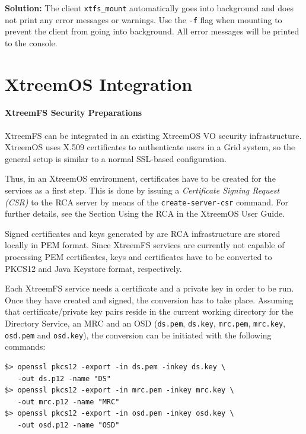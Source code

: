 \documentclass[a4paper,10pt]{book}
\begin{document}
\textbf{Solution: } The client \texttt{xtfs\_mount} automatically goes into background and does not print any error messages or warnings. Use the \texttt{-f} flag when mounting to prevent the client from going into background. All error messages will be printed to the console.

\appendix

\chapter{XtreemOS Integration}

\subsubsection{XtreemFS Security Preparations}
\label{installconf-xfs-security}

XtreemFS can be integrated in an existing XtreemOS VO security infrastructure. XtreemOS uses X.509 certificates to authenticate users in a Grid system, so the general setup is similar to a normal SSL-based configuration.

Thus, in an XtreemOS environment, certificates have to be created for the services as a first step. This is done by issuing a \textit{Certificate Signing Request (CSR)} to the RCA server by means of the \texttt{create-server-csr} command. For further details, see the Section Using the RCA in the XtreemOS User Guide.

Signed certificates and keys generated by are RCA infrastructure are stored locally in PEM format. Since XtreemFS services are currently not capable of processing PEM certificates, keys and certificates have to be converted to PKCS12 and Java Keystore format, respectively.

Each XtreemFS service needs a certificate and a private key in order to be run. Once they have created and signed, the conversion has to take place. Assuming that certificate/private key pairs reside in the current working directory for the Directory Service, an MRC and an OSD (\texttt{ds.pem}, \texttt{ds.key}, \texttt{mrc.pem}, \texttt{mrc.key}, \texttt{osd.pem} and \texttt{osd.key}), the conversion can be initiated with the following commands:


\begin{verbatim}
$> openssl pkcs12 -export -in ds.pem -inkey ds.key \
   -out ds.p12 -name "DS"
$> openssl pkcs12 -export -in mrc.pem -inkey mrc.key \
   -out mrc.p12 -name "MRC"
$> openssl pkcs12 -export -in osd.pem -inkey osd.key \
   -out osd.p12 -name "OSD"
\end{verbatim}
\end{document}
